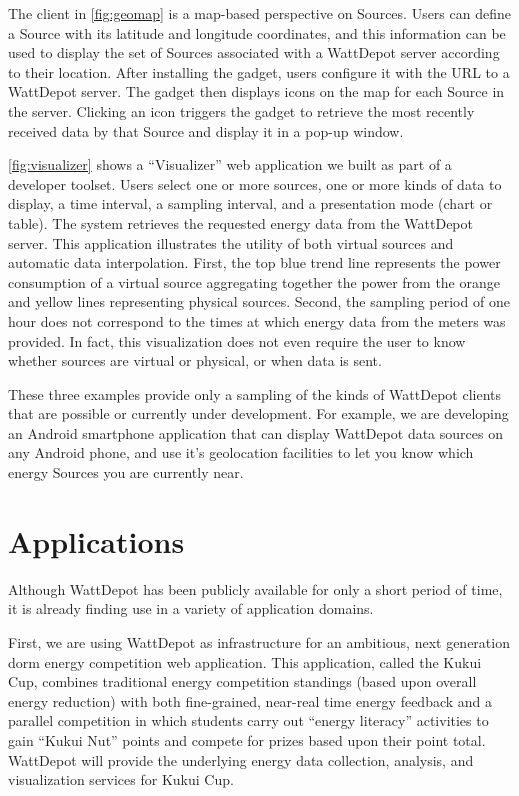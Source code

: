 \documentclass[conference]{IEEEtran}
\begin{document}
The client in \figurename \ref{fig:geomap} is a map-based perspective on
Sources.  Users can define a Source with its latitude and longitude
coordinates, and this information can be used to display the set of Sources
associated with a WattDepot server according to their location.  After
installing the gadget, users configure it with the URL to a WattDepot server.
The gadget then displays icons on the map for each Source in the server.
Clicking an icon triggers the gadget to retrieve the most recently received
data by that Source and display it in a pop-up window.

\figurename \ref{fig:visualizer} shows a ``Visualizer'' web application we built
as part of a developer toolset.  Users select one or more sources, one or
more kinds of data to display, a time interval, a sampling interval, and a
presentation mode (chart or table).  The system retrieves the requested
energy data from the WattDepot server.  This application illustrates the
utility of both virtual sources and automatic data interpolation. First,
the top blue trend line represents the power consumption of a virtual
source aggregating together the power from the orange and yellow lines
representing physical sources. Second, the sampling period of one hour does
not correspond to the times at which energy data from the meters was
provided.  In fact, this visualization does not even require the user to
know whether sources are virtual or physical, or when data is sent.

These three examples provide only a sampling of the kinds of WattDepot
clients that are possible or currently under development. For example, we
are developing an Android smartphone application that can display
WattDepot data sources on any Android phone, and use it's geolocation
facilities to let you know which energy Sources you are currently near.

\section{Applications}

Although WattDepot has been publicly available for only a short period of
time, it is already finding use in a variety of application domains. 

First, we are using WattDepot as infrastructure for an ambitious, next
generation dorm energy competition web application.  This application,
called the Kukui Cup, combines traditional energy competition standings
(based upon overall energy reduction) with both fine-grained, near-real
time energy feedback and a parallel competition in which students carry out
``energy literacy'' activities to gain ``Kukui Nut'' points and compete for
prizes based upon their point total.  WattDepot will provide the underlying
energy data collection, analysis, and visualization services for Kukui Cup.
\end{document}
